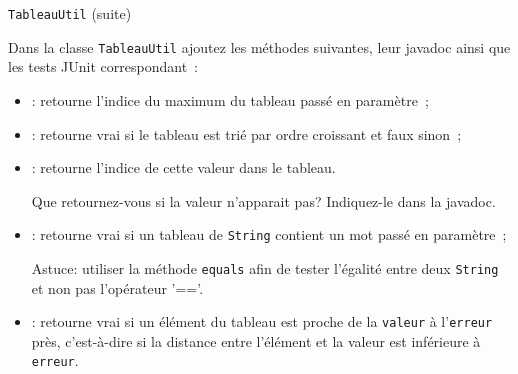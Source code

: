 \documentclass[a4paper,11pt]{article}
\begin{document}
	\begin{Exercice}{\texttt{TableauUtil} (suite)}	

		Dans la classe \texttt{TableauUtil} ajoutez les méthodes suivantes, leur javadoc ainsi que les tests JUnit correspondant~:
	\begin{itemize}
		\item {}: 
				retourne l'indice du maximum du tableau passé en paramètre~;
		\item {}: 
				retourne vrai si le tableau est trié par ordre croissant et 	
				faux sinon~;
		\item {}: 
				retourne l'indice de cette valeur dans le tableau. 
				
				Que retournez-vous si la valeur n'apparait pas?
				Indiquez-le dans la javadoc.
		\item  {}: 
			retourne vrai si un tableau de \texttt{String} contient un mot passé en
			paramètre~;
			
			Astuce: utiliser la méthode \texttt{equals} afin de tester 
			l'égalité entre deux \texttt{String} et non pas l'opérateur '=='.
		\item  {}: 
			retourne vrai si un élément du tableau est proche de la \texttt{valeur}
			à l'\texttt{erreur} près, c'est-à-dire si la distance entre l'élément 
			et la valeur est inférieure à \texttt{erreur}.
%	
	\end{itemize}
	\end{Exercice}
	
\end{document}
